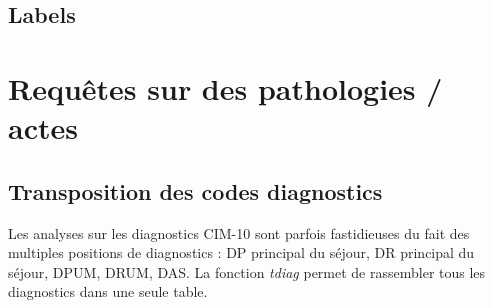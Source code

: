 \documentclass[
]{book}
\newenvironment{Shaded}{\begin{snugshade}}{\end{snugshade}}
\newcommand{\AttributeTok}[1]{\textcolor[rgb]{0.77,0.63,0.00}{#1}}
\newcommand{\CommentTok}[1]{\textcolor[rgb]{0.56,0.35,0.01}{\textit{#1}}}
\newcommand{\FunctionTok}[1]{\textcolor[rgb]{0.00,0.00,0.00}{#1}}
\newcommand{\NormalTok}[1]{#1}
\newcommand{\OtherTok}[1]{\textcolor[rgb]{0.56,0.35,0.01}{#1}}
\newcommand{\SpecialCharTok}[1]{\textcolor[rgb]{0.00,0.00,0.00}{#1}}
\begin{document}
\hypertarget{labels}{%
\section{Labels}\label{labels}}

\begin{Shaded}
\end{Shaded}

\hypertarget{requuxeates-sur-des-pathologies-actes}{%
\chapter{Requêtes sur des pathologies / actes}\label{requuxeates-sur-des-pathologies-actes}}

\hypertarget{transposition-des-codes-diagnostics}{%
\section{Transposition des codes diagnostics}\label{transposition-des-codes-diagnostics}}

Les analyses sur les diagnostics CIM-10 sont parfois fastidieuses du fait des multiples positions de diagnostics : DP principal du séjour, DR principal du séjour, DPUM, DRUM, DAS. La fonction \emph{tdiag} permet de rassembler tous les diagnostics dans une seule table.

\begin{Shaded}
\end{Shaded}
\end{document}
